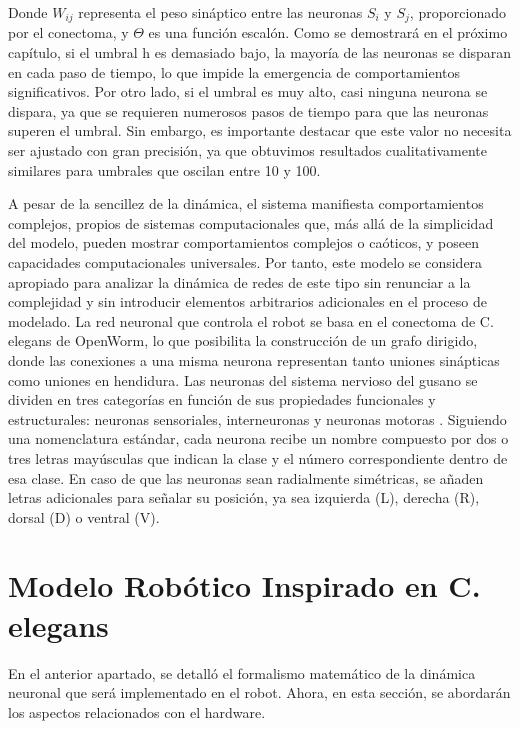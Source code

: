 Donde $W_{ij}$  representa el peso sináptico entre las neuronas $S_i$ y $S_j$, proporcionado por el conectoma, y $\Theta$ es una función escalón. Como se demostrará en el próximo capítulo, si el umbral h es demasiado bajo, la mayoría de las neuronas se disparan en cada paso de tiempo, lo que impide la emergencia de comportamientos significativos. Por otro lado, si el umbral es muy alto, casi ninguna neurona se dispara, ya que se requieren numerosos pasos de tiempo para que las neuronas superen el umbral. Sin embargo, es importante destacar que este valor no necesita ser ajustado con gran precisión, ya que obtuvimos resultados cualitativamente similares para umbrales que oscilan entre 10 y 100.

A pesar de la sencillez de la dinámica, el sistema manifiesta comportamientos complejos, propios de sistemas computacionales que, más allá de la simplicidad del modelo, pueden mostrar comportamientos complejos o caóticos, y poseen capacidades computacionales universales. Por tanto, este modelo se considera apropiado para analizar la dinámica de redes de este tipo sin renunciar a la complejidad y sin introducir elementos arbitrarios adicionales en el proceso de modelado. La red neuronal que controla el robot se basa en el conectoma de C. elegans de OpenWorm, lo que posibilita la construcción de un grafo dirigido, donde las conexiones a una misma neurona representan tanto uniones sinápticas como uniones en hendidura. Las neuronas del sistema nervioso del gusano se dividen en tres categorías en función de sus propiedades funcionales y estructurales: neuronas sensoriales, interneuronas y neuronas motoras \cite{cook_whole-animal_2019}. Siguiendo una nomenclatura estándar, cada neurona recibe un nombre compuesto por dos o tres letras mayúsculas que indican la clase y el número correspondiente dentro de esa clase. En caso de que las neuronas sean radialmente simétricas, se añaden letras adicionales para señalar su posición, ya sea izquierda (L), derecha (R), dorsal (D) o ventral (V).






\section{Modelo  Robótico Inspirado en C. elegans}\label{sec:Neuro-robot}

En el anterior apartado, se detalló el formalismo matemático de la dinámica neuronal que será implementado en el robot. Ahora, en esta sección, se abordarán los aspectos relacionados con el hardware.

